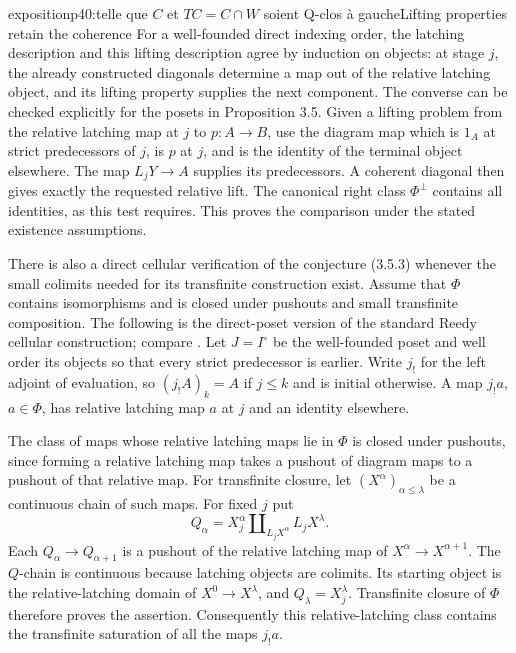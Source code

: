 \begin{dcomment}{exposition}{p40:telle que $C$ et $TC=C\cap W$ soient Q-clos à gauche}{Lifting properties retain the coherence}
For a well-founded direct indexing order, the latching description and this lifting description agree by induction on objects: at stage $j$, the already constructed diagonals determine a map out of the relative latching object, and its lifting property supplies the next component. The converse can be checked explicitly for the posets in Proposition 3.5. Given a lifting problem from the relative latching map at $j$ to $p:A\to B$, use the diagram map which is $1_A$ at strict predecessors of $j$, is $p$ at $j$, and is the identity of the terminal object elsewhere. The map $L_jY\to A$ supplies its predecessors. A coherent diagonal then gives exactly the requested relative lift. The canonical right class $\Phi^\perp$ contains all identities, as this test requires. This proves the comparison under the stated existence assumptions.

There is also a direct cellular verification of the conjecture (3.5.3) whenever the small colimits needed for its transfinite construction exist. Assume that $\Phi$ contains isomorphisms and is closed under pushouts and small transfinite composition. The following is the direct-poset version of the standard Reedy cellular construction; compare \citet[Proposition~6.3 and Corollary~6.7]{RiehlVerity2014Reedy}. Let $J=I^\circ$ be the well-founded poset and well order its objects so that every strict predecessor is earlier. Write $j_!$ for the left adjoint of evaluation, so $(j_!A)_k=A$ if $j\leq k$ and is initial otherwise. A map $j_!a$, $a\in\Phi$, has relative latching map $a$ at $j$ and an identity elsewhere.

The class of maps whose relative latching maps lie in $\Phi$ is closed under pushouts, since forming a relative latching map takes a pushout of diagram maps to a pushout of that relative map. For transfinite closure, let $(X^\alpha)_{\alpha\leq\lambda}$ be a continuous chain of such maps. For fixed $j$ put
\[
 Q_\alpha=X^\alpha_j\amalg_{L_jX^\alpha}L_jX^\lambda.
\]
Each $Q_\alpha\to Q_{\alpha+1}$ is a pushout of the relative latching map of $X^\alpha\to X^{\alpha+1}$. The $Q$-chain is continuous because latching objects are colimits. Its starting object is the relative-latching domain of $X^0\to X^\lambda$, and $Q_\lambda=X^\lambda_j$. Transfinite closure of $\Phi$ therefore proves the assertion. Consequently this relative-latching class contains the transfinite saturation of all the maps $j_!a$.


\end{dcomment}
